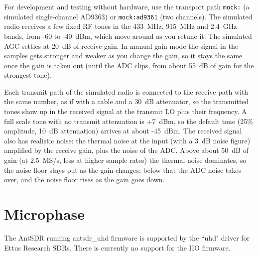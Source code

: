 For development and testing without hardware, use the transport path \texttt{mock:} (a simulated single-channel
AD9363) or \texttt{mock:ad9361} (two channels). The simulated radio receives a few fixed RF tones in the 433~MHz,
915~MHz and 2.4~GHz bands, from -60 to -40~dBm, which move around as you retune it. The simulated AGC settles at
20~dB of receive gain. In manual gain mode the signal in the samples gets stronger and weaker as you change the gain,
so it stays the same once the gain is taken out (until the ADC clips, from about 55~dB of gain for the strongest
tone).

Each transmit path of the simulated radio is connected to the receive path with the same number, as if with a cable
and a 30~dB attenuator, so the transmitted tones show up in the received signal at the transmit LO plus their
frequency. A full scale tone with no transmit attenuation is +7~dBm, so the default tone (25\% amplitude, 10~dB
attenuation) arrives at about -45~dBm. The received signal also has realistic noise: the thermal noise at the input
(with a 3~dB noise figure) amplified by the receive gain, plus the noise of the ADC. Above about 50~dB of gain (at
2.5~MS/s, less at higher sample rates) the thermal noise dominates, so the noise floor stays put as the gain
changes; below that the ADC noise takes over, and the noise floor rises as the gain goes down.

\section{Microphase}

The AntSDR running antsdr\_uhd firmware is supported by the ``uhd" driver for Ettus Research SDRs. There is currently no
support for the IIO firmware.
